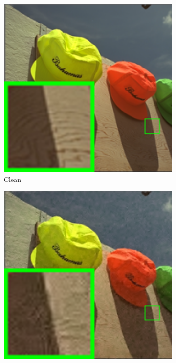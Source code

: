 \begin{figure}
\begin{subfigure}[t]{0.19\textwidth}
        \includegraphics[width=1\textwidth]{images/mcwnnm/24images/resize_br_kodim03.png}
		\caption{Clean}
    \end{subfigure}
    \hfill
    \begin{subfigure}[t]{0.19\textwidth}
        \centering
        \includegraphics[width=1\textwidth]{images/mcwnnm/24images/resize_br_CBM3D_nSig402030_kodim03.png}

\end{subfigure}
\end{figure}
